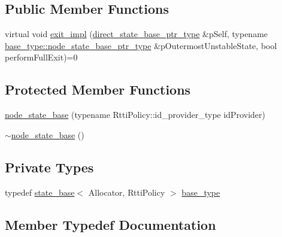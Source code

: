 \subsection*{Public Member Functions}
\begin{DoxyCompactItemize}
\item 
virtual void \mbox{\hyperlink{classboost_1_1statechart_1_1detail_1_1node__state__base_a51126f01f03bd9eaa8b4e61e176c9198}{exit\+\_\+impl}} (\mbox{\hyperlink{classboost_1_1statechart_1_1detail_1_1node__state__base_a52fa5db06246a5d37b5980aa378fa41c}{direct\+\_\+state\+\_\+base\+\_\+ptr\+\_\+type}} \&p\+Self, typename \mbox{\hyperlink{classboost_1_1statechart_1_1detail_1_1state__base_a8e3dd0f80bf95d7df21417a50f1dbaa1}{base\+\_\+type\+::node\+\_\+state\+\_\+base\+\_\+ptr\+\_\+type}} \&p\+Outermost\+Unstable\+State, bool perform\+Full\+Exit)=0
\end{DoxyCompactItemize}
\subsection*{Protected Member Functions}
\begin{DoxyCompactItemize}
\item 
\mbox{\hyperlink{classboost_1_1statechart_1_1detail_1_1node__state__base_a3b2743a458153bb73abe1fe9f265ba74}{node\+\_\+state\+\_\+base}} (typename Rtti\+Policy\+::id\+\_\+provider\+\_\+type id\+Provider)
\item 
\mbox{\hyperlink{classboost_1_1statechart_1_1detail_1_1node__state__base_ab25faae46c5dd39a4011960bbdd376ca}{$\sim$node\+\_\+state\+\_\+base}} ()
\end{DoxyCompactItemize}
\subsection*{Private Types}
\begin{DoxyCompactItemize}
\item 
typedef \mbox{\hyperlink{classboost_1_1statechart_1_1detail_1_1state__base}{state\+\_\+base}}$<$ Allocator, Rtti\+Policy $>$ \mbox{\hyperlink{classboost_1_1statechart_1_1detail_1_1node__state__base_a6a4897d400d9fb49ee9a7dac1f6c6f58}{base\+\_\+type}}
\end{DoxyCompactItemize}


\subsection{Member Typedef Documentation}
\mbox{\label{classboost_1_1statechart_1_1detail_1_1node__state__base_a6a4897d400d9fb49ee9a7dac1f6c6f58}} 
